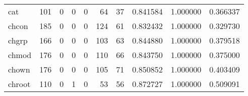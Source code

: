 \begin{longtable}{lrrrrrrrrr}
cat       &                                   101 &                                                  0 &                                                  0 &                                                  0 &                                                 64 &                                                 37 &                                           0.841584 &                               1.000000 &                             0.366337 \\
chcon     &                                   185 &                                                  0 &                                                  0 &                                                  0 &                                                124 &                                                 61 &                                           0.832432 &                               1.000000 &                             0.329730 \\
chgrp     &                                   166 &                                                  0 &                                                  0 &                                                  0 &                                                103 &                                                 63 &                                           0.844880 &                               1.000000 &                             0.379518 \\
chmod     &                                   176 &                                                  0 &                                                  0 &                                                  0 &                                                110 &                                                 66 &                                           0.843750 &                               1.000000 &                             0.375000 \\
chown     &                                   176 &                                                  0 &                                                  0 &                                                  0 &                                                105 &                                                 71 &                                           0.850852 &                               1.000000 &                             0.403409 \\
chroot    &                                   110 &                                                  0 &                                                  1 &                                                  0 &                                                 53 &                                                 56 &                                           0.872727 &                               1.000000 &                             0.509091 \\

\end{longtable}
